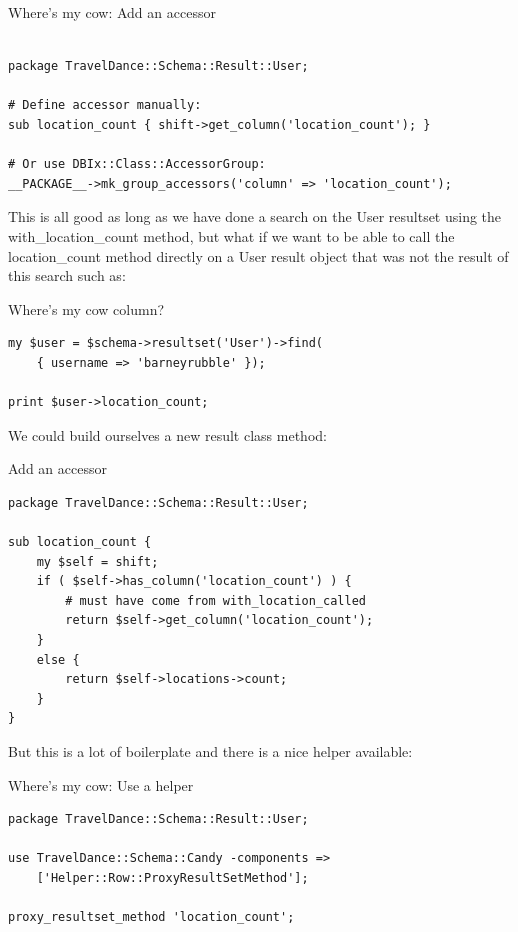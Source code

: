 \begin{frame}[fragile]{Where's my cow: Add an accessor}
\begin{lstlisting}

package TravelDance::Schema::Result::User;

# Define accessor manually:
sub location_count { shift->get_column('location_count'); }

# Or use DBIx::Class::AccessorGroup:
__PACKAGE__->mk_group_accessors('column' => 'location_count');

\end{lstlisting}
\end{frame}

This is all good as long as we have done a search on the User resultset
using the with\_location\_count method, but what if we want to be able to call
the location\_count method directly on a User result object that was not the
result of this search such as:

\begin{frame}[fragile]{Where's my cow column?}
\begin{lstlisting}
my $user = $schema->resultset('User')->find(
    { username => 'barneyrubble' });

print $user->location_count;
\end{lstlisting}
\end{frame}

We could build ourselves a new result class method:

\begin{frame}[fragile]{Add an accessor}
\begin{lstlisting}
package TravelDance::Schema::Result::User;

sub location_count {
    my $self = shift;
    if ( $self->has_column('location_count') ) {
        # must have come from with_location_called
        return $self->get_column('location_count');
    }
    else {
        return $self->locations->count;
    }
}
\end{lstlisting}
\end{frame}

But this is a lot of boilerplate and there is a nice helper available:

\begin{frame}[fragile]{Where's my cow: Use a helper}
\begin{lstlisting}
package TravelDance::Schema::Result::User;

use TravelDance::Schema::Candy -components =>
    ['Helper::Row::ProxyResultSetMethod'];

proxy_resultset_method 'location_count';
\end{lstlisting}
\end{frame}

